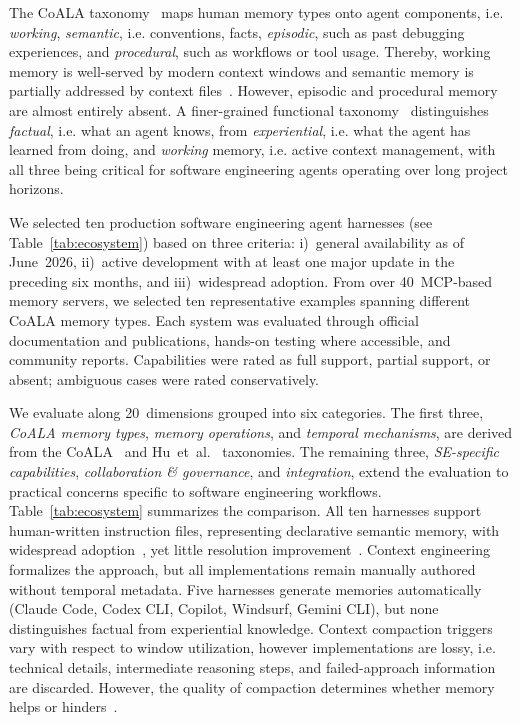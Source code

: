 \documentclass[runningheads]{llncs}
\begin{document}
The CoALA taxonomy~\cite{sumers2024} maps human memory types onto agent
components, i.e. \emph{working}, \emph{semantic}, i.e. conventions, facts, \emph{episodic}, such as past debugging experiences, and
\emph{procedural}, such as workflows or tool usage. Thereby, working memory is well-served by modern
context windows and semantic memory is partially addressed by context
files~\cite{agentreadmes2025}. However, episodic and procedural memory are almost
entirely absent. A finer-grained functional taxonomy~\cite{hu2025survey}
distinguishes \emph{factual}, i.e. what an agent knows, from \emph{experiential}, i.e. what the agent has learned from doing, and \emph{working} memory, i.e. active context management, with all three being critical for software engineering agents
operating over long project horizons.

We selected ten production software engineering agent harnesses (see Table~\ref{tab:ecosystem}) based on three criteria: i)~general availability as of June~2026, ii)~active development with at least one major update in the preceding six months, and iii)~widespread adoption. From over 40~MCP-based memory servers, we selected ten representative examples spanning different CoALA memory types. Each system was evaluated through official documentation and publications, hands-on testing where accessible, and community reports. Capabilities were rated as full support, partial support, or absent; ambiguous cases were rated conservatively.

We evaluate along 20~dimensions grouped into six categories. The first three, \emph{CoALA memory types}, \emph{memory operations}, and \emph{temporal mechanisms}, are derived from the CoALA~\cite{sumers2024} and Hu~et~al.~\cite{hu2025survey} taxonomies. The remaining three, \emph{SE-specific capabilities}, \emph{collaboration \& governance}, and \emph{integration}, extend the evaluation to practical concerns specific to software engineering workflows. Table~\ref{tab:ecosystem} summarizes the comparison. All ten harnesses support human-written instruction files, representing declarative semantic memory, with widespread adoption~\cite{agentreadmes2025}, yet little resolution improvement~\cite{gloaguen2026}. Context
engineering~\cite{contexteng2026} formalizes the approach, but all
implementations remain manually authored without temporal metadata. Five harnesses generate memories automatically (Claude Code, Codex CLI,
Copilot, Windsurf, Gemini CLI), but none distinguishes factual from
experiential knowledge. 
Context compaction triggers vary with respect to window utilization, however implementations are lossy, i.e.
technical details, intermediate reasoning steps, and
failed-approach information are discarded. However, the quality of compaction determines
whether memory helps or hinders~\cite{zhu2026}. 
\end{document}
